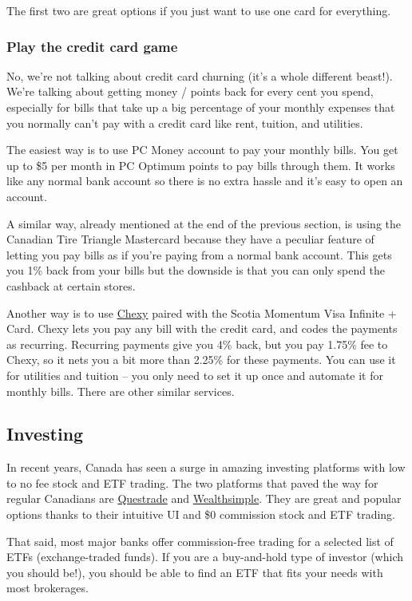     The first two are great options if you just want to use one card for everything. 

\subsubsection{Play the credit card game}

    No, we're not talking about credit card churning (it's a whole different beast!). We're talking about getting money / points back for every cent you spend, especially for bills that take up a big percentage of your monthly expenses that you normally can't pay with a credit card like rent, tuition, and utilities.

    The easiest way is to use PC Money account to pay your monthly bills. You get up to \$5 per month in PC Optimum points to pay bills through them. It works like any normal bank account so there is no extra hassle and it's easy to open an account. 

    A similar way, already mentioned at the end of the previous section, is using the Canadian Tire Triangle Mastercard because they have a peculiar feature of letting you pay bills as if you're paying from a normal bank account. This gets you 1\% back from your bills but the downside is that you can only spend the cashback at certain stores.  

    Another way is to use \href{https://chexy.co/}{Chexy} paired with the Scotia Momentum Visa Infinite + Card. Chexy lets you pay any bill with the credit card, and codes the payments as recurring. Recurring payments give you 4\% back, but you pay 1.75\% fee to Chexy, so it nets you a bit more than 2.25\% for these payments. You can use it for utilities and tuition -- you only need to set it up once and automate it for monthly bills. There are other similar services.


\subsection{Investing} 

In recent years, Canada has seen a surge in amazing investing platforms with low to no fee stock and ETF trading. The two platforms that paved the way for regular Canadians are \href{https://www.questrade.com/}{Questrade} and \href{https://www.wealthsimple.com/en-ca}{Wealthsimple}. They are great and popular options thanks to their intuitive UI and \$0 commission stock and ETF trading.

That said, most major banks offer commission-free trading for a selected list of ETFs (exchange-traded funds). If you are a buy-and-hold type of investor (which you should be!), you should be able to find an ETF that fits your needs with most brokerages.


